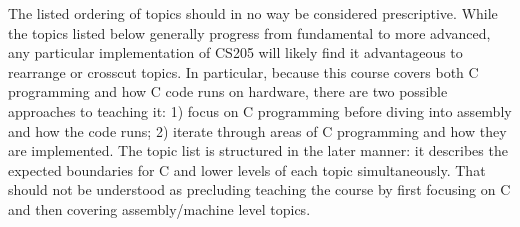 \documentclass[12pt,letterpaper]{article}
\begin{document}
	

	The listed ordering of topics should in no way be considered prescriptive. While the topics listed below generally progress from fundamental to more advanced, any particular implementation of CS205 will likely find it advantageous to rearrange or crosscut topics. In particular, because this course covers both C programming and how C code runs on hardware, there are two possible approaches to teaching it: 1) focus on C programming before diving into assembly and how the code runs; 2) iterate through areas of C programming and how they are implemented. The topic list is structured in the later manner: it describes the expected boundaries for C and lower levels of each topic simultaneously. That should not be understood as precluding teaching the course by first focusing on C and then covering assembly/machine level topics.
\end{document}
